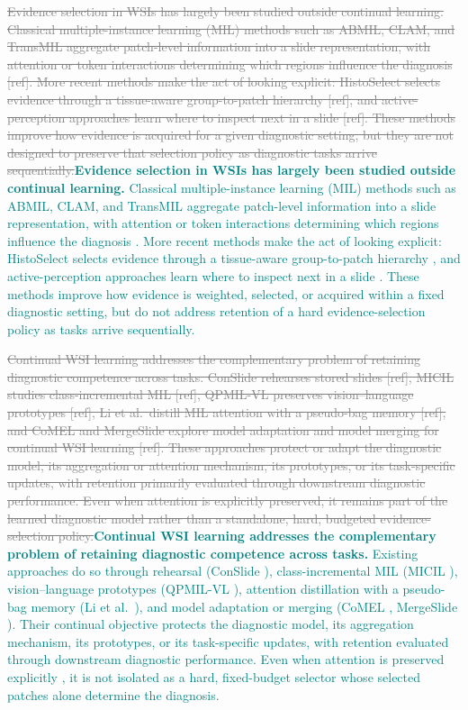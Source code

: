 \documentclass{article}
\newif\ifmarkup \markuptrue
\newcommand{\repc}[3]{\ifmarkup\textcolor{gray}{\sout{#2}}\textcolor{#1}{#3}\else#3\fi}
\newcommand{\repG}[2]{\repc{teal}{#1}{#2}}    %
\begin{document}
\repG{Evidence selection in WSIs has largely been studied outside continual learning. Classical multiple-instance learning (MIL) methods such as ABMIL, CLAM, and TransMIL aggregate patch-level information into a slide representation, with attention or token interactions determining which regions influence the diagnosis [ref]. More recent methods make the act of looking explicit: HistoSelect selects evidence through a tissue-aware group-to-patch hierarchy [ref], and active-perception approaches learn where to inspect next in a slide [ref]. These methods improve how evidence is acquired for a given diagnostic setting, but they are not designed to preserve that selection policy as diagnostic tasks arrive sequentially.}{\textbf{Evidence selection in WSIs has largely been studied outside continual learning.} Classical multiple-instance learning (MIL) methods such as ABMIL, CLAM, and TransMIL aggregate patch-level information into a slide representation, with attention or token interactions determining which regions influence the diagnosis \cite{ilse2018abmil,lu2021clam,shao2021transmil}. More recent methods make the act of looking explicit: HistoSelect selects evidence through a tissue-aware group-to-patch hierarchy \cite{huang2026histoselect}, and active-perception approaches learn where to inspect next in a slide \cite{chen2026adaptivepath}. These methods improve how evidence is weighted, selected, or acquired within a fixed diagnostic setting, but do not address retention of a hard evidence-selection policy as tasks arrive sequentially.}

\repG{Continual WSI learning addresses the complementary problem of retaining diagnostic competence across tasks. ConSlide rehearses stored slides [ref], MICIL studies class-incremental MIL [ref], QPMIL-VL preserves vision--language prototypes [ref], Li et al.\ distill MIL attention with a pseudo-bag memory [ref], and CoMEL and MergeSlide explore model adaptation and model merging for continual WSI learning [ref]. These approaches protect or adapt the diagnostic model, its aggregation or attention mechanism, its prototypes, or its task-specific updates, with retention primarily evaluated through downstream diagnostic performance. Even when attention is explicitly preserved, it remains part of the learned diagnostic model rather than a standalone, hard, budgeted evidence-selection policy.}{\textbf{Continual WSI learning addresses the complementary problem of retaining diagnostic competence across tasks.} Existing approaches do so through rehearsal (ConSlide \cite{huang2023conslide}), class-incremental MIL (MICIL \cite{meseguer2024micil}), vision--language prototypes (QPMIL-VL \cite{gou2025qpmil}), attention distillation with a pseudo-bag memory (Li et al.\ \cite{li2025akd}), and model adaptation or merging (CoMEL \cite{lee2025comel}, MergeSlide \cite{bui2026mergeslide}). Their continual objective protects the diagnostic model, its aggregation mechanism, its prototypes, or its task-specific updates, with retention evaluated through downstream diagnostic performance. Even when attention is preserved explicitly \cite{li2025akd}, it is not isolated as a hard, fixed-budget selector whose selected patches alone determine the diagnosis.}
\end{document}
